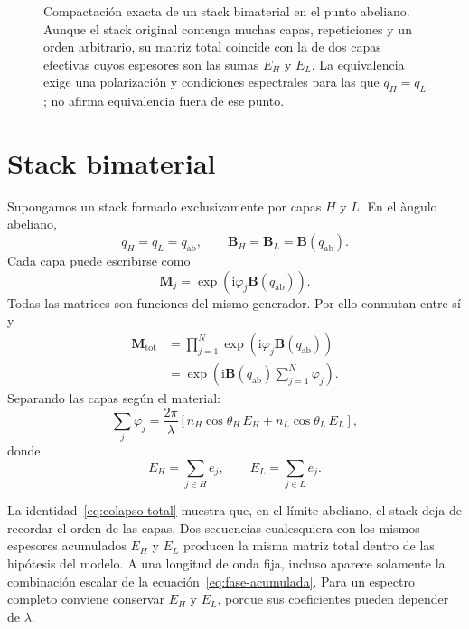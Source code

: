 \documentclass[10pt,a4paper]{article}
\newcommand{\ii}{\mathrm{i}}
\newcommand{\M}{\mathbf{M}}
\newcommand{\B}{\mathbf{B}}
\newcommand{\qab}{q_{\mathrm{ab}}}
\begin{document}
\begin{figure}[!t]
\caption{Compactaci\'on exacta de un stack bimaterial en el punto abeliano. Aunque el stack original contenga muchas capas, repeticiones y un orden arbitrario, su matriz total coincide con la de dos capas efectivas cuyos espesores son las sumas $E_H$ y $E_L$. La equivalencia exige una polarizaci\'on y condiciones espectrales para las que $q_H=q_L$; no afirma equivalencia fuera de ese punto.}
\label{fig:compactacion-abeliana}
\end{figure}

\section{Stack bimaterial}

Supongamos un stack formado exclusivamente por capas $H$ y $L$. En el \`angulo abeliano,
\begin{equation}
q_H=q_L=\qab,
\qquad
\B_H=\B_L=\B(\qab).
\end{equation}
Cada capa puede escribirse como
\begin{equation}
\M_j=\exp\!\left(\ii\varphi_j\B(\qab)\right).
\end{equation}
Todas las matrices son funciones del mismo generador. Por ello conmutan entre s\'i y
\begin{align}
\M_{\mathrm{tot}}
&=\prod_{j=1}^{N}\exp\!\left(\ii\varphi_j\B(\qab)\right)\\
&=\exp\!\left(\ii\B(\qab)\sum_{j=1}^{N}\varphi_j\right).
\label{eq:colapso-total}
\end{align}
Separando las capas seg\'un el material:
\begin{equation}
\sum_j\varphi_j
=\frac{2\pi}{\lambda}\left[
n_H\cos\theta_H\,E_H+n_L\cos\theta_L\,E_L
\right],
\label{eq:fase-acumulada}
\end{equation}
donde
\begin{equation}
E_H=\sum_{j\in H}e_j,
\qquad
E_L=\sum_{j\in L}e_j.
\end{equation}

\begin{resultbox}
La identidad~\eqref{eq:colapso-total} muestra que, en el l\'imite abeliano, el stack deja de recordar el orden de las capas. Dos secuencias cualesquiera con los mismos espesores acumulados $E_H$ y $E_L$ producen la misma matriz total dentro de las hip\'otesis del modelo. A una longitud de onda fija, incluso aparece solamente la combinaci\'on escalar de la ecuaci\'on~\eqref{eq:fase-acumulada}. Para un espectro completo conviene conservar $E_H$ y $E_L$, porque sus coeficientes pueden depender de $\lambda$.
\end{resultbox}
\end{document}
